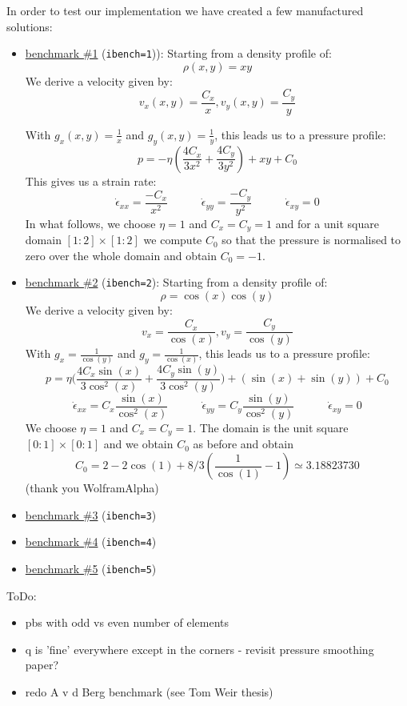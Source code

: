 \newpage
In order to test our implementation we have created a few manufactured solutions:
\begin{itemize}
\item \underline{benchmark \#1} ({\tt ibench=1})): Starting from a density profile of:
\begin{equation}
    \rho(x,y) = xy
\end{equation}
We derive a velocity given by:
\begin{equation}
    v_x(x,y) = \frac{C_x}{x} , v_y(x,y) = \frac{C_y}{y}
\end{equation}

With $g_x(x,y) = \frac{1}{x}$ and $g_y(x,y) = \frac{1}{y}$, this leads us to a pressure profile:
\begin{equation}
    p = - \eta \left( \frac{4C_x}{3x^2} + \frac{4C_y}{3y^2} \right)  + xy + C_0
\end{equation}
This gives us a strain rate:
\[
\dot{\epsilon}_{xx} =  \frac{-C_x}{x^2}
\quad
\quad
\quad
\dot{\epsilon}_{yy} =  \frac{-C_y}{y^2}
\quad
\quad
\quad
\dot{\epsilon}_{xy} = 0 
\]
In what follows, we choose $\eta=1$ and $C_x=C_y=1$ and for a unit square domain $
[1:2]\times[1:2]$ we compute $C_0$
so that the pressure is normalised to zero over the whole domain and obtain $C_0=-1$. 
 
\item \underline{benchmark \#2} ({\tt ibench=2}): Starting from a density profile of:
\begin{equation}
    \rho = \cos(x)\cos(y)
\end{equation}
We derive a velocity given by:
\begin{equation}
    v_x = \frac{C_x}{\cos(x)} , v_y = \frac{C_y}{\cos(y)}
\end{equation}
With $g_x = \frac{1}{\cos(y)}$ and $g_y = \frac{1}{\cos(x)}$, this leads us to a pressure profile:
\begin{equation}
    p =  \eta \Bigg(\frac{4C_x \sin(x)}{3\cos^2(x)} + \frac{4C_y \sin(y)}{3\cos^2(y)}\Bigg) 
    +( \sin(x) + \sin(y) ) + C_0
\end{equation}
\[
\dot{\epsilon}_{xx} = C_x \frac{\sin(x)}{\cos^2(x)}
\quad
\quad
\quad
\dot{\epsilon}_{yy} = C_y \frac{\sin(y)}{\cos^2(y)}
\quad
\quad
\quad
\dot{\epsilon}_{xy} = 0 
\]
We choose $\eta=1$ and $C_x=C_y=1$. The domain is the unit square $[0:1]\times[0:1]$ and we obtain 
$C_0$ as before and obtain 
\[
C_0 = 2 - 2 \cos(1) + 8/3 (\frac{1}{\cos (1)} - 1)
\simeq 3.18823730
\]
(thank you WolframAlpha)


\item \underline{benchmark \#3} ({\tt ibench=3}) 
\item \underline{benchmark \#4} ({\tt ibench=4}) 
\item \underline{benchmark \#5} ({\tt ibench=5}) 
\end{itemize}






ToDo:
\begin{itemize}
\item pbs with odd vs even number of elements 
\item q is 'fine' everywhere except in the corners - revisit pressure smoothing paper?
\item redo A v d Berg benchmark (see Tom Weir thesis)
\end{itemize}



